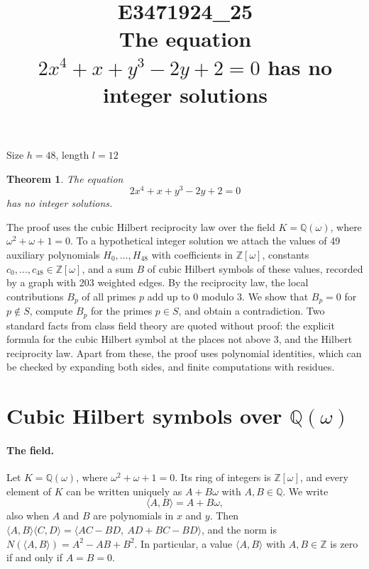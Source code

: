 \documentclass[11pt]{article}
\title{\textbf{E3471924\_25}\\[4pt] {\Large The equation $2x^{4}+x+y^{3}-2y+2=0$ has no integer solutions}}
\author{}
\date{}
\newtheorem{theorem}{Theorem}
\newcommand{\Z}{\mathbb{Z}}
\newcommand{\Q}{\mathbb{Q}}
\begin{document}
\maketitle
\vspace{-8ex}
\begin{center}
Size $h=48$, length $l=12$
\end{center}

\begin{theorem}\label{thm:main}
The equation
\begin{equation}\label{eq:main}
2x^{4}+x+y^{3}-2y+2=0
\end{equation}
has no integer solutions.
\end{theorem}

The proof uses the cubic Hilbert reciprocity law over the field $K=\Q(\omega)$, where $\omega^2+\omega+1=0$. To a hypothetical integer solution we attach the values of 49 auxiliary polynomials $H_0,\dots,H_{48}$ with coefficients in $\Z[\omega]$, constants $c_0,\dots,c_{48}\in\Z[\omega]$, and a sum $B$ of cubic Hilbert symbols of these values, recorded by a graph with 203 weighted edges. By the reciprocity law, the local contributions $B_p$ of all primes $p$ add up to $0$ modulo $3$. We show that $B_p=0$ for $p\notin S$, compute $B_p$ for the primes $p\in S$, and obtain a contradiction. Two standard facts from class field theory are quoted without proof: the explicit formula for the cubic Hilbert symbol at the places not above $3$, and the Hilbert reciprocity law. Apart from these, the proof uses polynomial identities, which can be checked by expanding both sides, and finite computations with residues.


\section{\texorpdfstring{Cubic Hilbert symbols over $\Q(\omega)$}{Cubic Hilbert symbols over Q(w)}}\label{sec:symbols}

\paragraph{The field.} Let $K=\Q(\omega)$, where $\omega^2+\omega+1=0$. Its ring of integers is $\Z[\omega]$, and every element of $K$ can be written uniquely as $A+B\omega$ with $A,B\in\Q$. We write
\[
\langle A,B\rangle=A+B\omega,
\]
also when $A$ and $B$ are polynomials in $x$ and $y$. Then $\langle A,B\rangle\langle C,D\rangle=\langle AC-BD,\ AD+BC-BD\rangle$, and the norm is $N(\langle A,B\rangle)=A^2-AB+B^2$. In particular, a value $\langle A,B\rangle$ with $A,B\in\Z$ is zero if and only if $A=B=0$.
\end{document}
